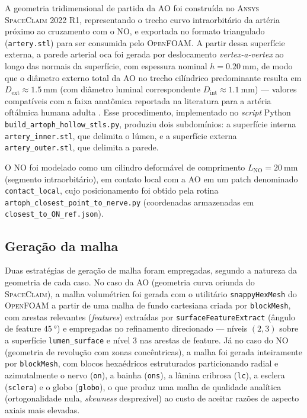 A geometria tridimensional de partida da AO foi construída no \textsc{Ansys SpaceClaim 2022 R1}, representando o trecho curvo intraorbitário da artéria próximo ao cruzamento com o NO, e exportada no formato triangulado (\texttt{artery.stl}) para ser consumida pelo \textsc{OpenFOAM}. A partir dessa superfície externa, a parede arterial oca foi gerada por deslocamento \emph{vertex-a-vertex} ao longo das normais da superfície, com espessura nominal \(h = \SI{0,20}{\milli\meter}\), de modo que o diâmetro externo total da AO no trecho cilíndrico predominante resulta em \(D_{\mathrm{ext}} \approx \SI{1,5}{\milli\meter}\) (com diâmetro luminal correspondente \(D_{\mathrm{int}} \approx \SI{1,1}{\milli\meter}\)) --- valores compatíveis com a faixa anatômica reportada na literatura para a artéria oftálmica humana adulta \citep{Michalinos2015}. Esse procedimento, implementado no \emph{script} Python \texttt{build\_artoph\_hollow\_stls.py}, produziu dois subdomínios: a superfície interna \texttt{artery\_inner.stl}, que delimita o lúmen, e a superfície externa \texttt{artery\_outer.stl}, que delimita a parede.

O NO foi modelado como um cilindro deformável de comprimento \(L_{\mathrm{NO}} = \SI{20}{\milli\meter}\) (segmento intraorbitário), em contato local com a AO em um patch denominado \texttt{contact\_local}, cujo posicionamento foi obtido pela rotina \texttt{artoph\_closest\_point\_to\_nerve.py} (coordenadas armazenadas em \texttt{closest\_to\_ON\_ref.json}).

\subsection{Geração da malha}
\label{sec:metodologia-malha}

Duas estratégias de geração de malha foram empregadas, segundo a natureza da geometria de cada caso. No caso da AO (geometria curva oriunda do \textsc{SpaceClaim}), a malha volumétrica foi gerada com o utilitário \texttt{snappyHexMesh} do \textsc{OpenFOAM} a partir de uma malha de fundo cartesiana criada por \texttt{blockMesh}, com arestas relevantes (\emph{features}) extraídas por \texttt{surfaceFeatureExtract} (ângulo de feature \(\SI{45}{\degree}\)) e empregadas no refinamento direcionado --- níveis \((2, 3)\) sobre a superfície \texttt{lumen\_surface} e nível 3 nas arestas de feature. Já no caso do NO (geometria de revolução com zonas concêntricas), a malha foi gerada inteiramente por \texttt{blockMesh}, com blocos hexaédricos estruturados particionando radial e azimutalmente o nervo (\texttt{on}), a bainha (\texttt{ons}), a lâmina cribrosa (\texttt{lc}), a esclera (\texttt{sclera}) e o globo (\texttt{globo}), o que produz uma malha de qualidade analítica (ortogonalidade nula, \emph{skewness} desprezível) ao custo de aceitar razões de aspecto axiais mais elevadas.


